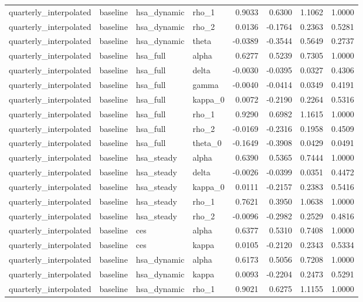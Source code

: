\begin{tabular}{llllrrrr}
quarterly\_interpolated & baseline & hsa\_dynamic & rho\_1 & 0.9033 & 0.6300 & 1.1062 & 1.0000 \\
quarterly\_interpolated & baseline & hsa\_dynamic & rho\_2 & 0.0136 & -0.1764 & 0.2363 & 0.5281 \\
quarterly\_interpolated & baseline & hsa\_dynamic & theta & -0.0389 & -0.3544 & 0.5649 & 0.2737 \\
quarterly\_interpolated & baseline & hsa\_full & alpha & 0.6277 & 0.5239 & 0.7305 & 1.0000 \\
quarterly\_interpolated & baseline & hsa\_full & delta & -0.0030 & -0.0395 & 0.0327 & 0.4306 \\
quarterly\_interpolated & baseline & hsa\_full & gamma & -0.0040 & -0.0414 & 0.0349 & 0.4191 \\
quarterly\_interpolated & baseline & hsa\_full & kappa\_0 & 0.0072 & -0.2190 & 0.2264 & 0.5316 \\
quarterly\_interpolated & baseline & hsa\_full & rho\_1 & 0.9290 & 0.6982 & 1.1615 & 1.0000 \\
quarterly\_interpolated & baseline & hsa\_full & rho\_2 & -0.0169 & -0.2316 & 0.1958 & 0.4509 \\
quarterly\_interpolated & baseline & hsa\_full & theta\_0 & -0.1649 & -0.3908 & 0.0429 & 0.0491 \\
quarterly\_interpolated & baseline & hsa\_steady & alpha & 0.6390 & 0.5365 & 0.7444 & 1.0000 \\
quarterly\_interpolated & baseline & hsa\_steady & delta & -0.0026 & -0.0399 & 0.0351 & 0.4472 \\
quarterly\_interpolated & baseline & hsa\_steady & kappa\_0 & 0.0111 & -0.2157 & 0.2383 & 0.5416 \\
quarterly\_interpolated & baseline & hsa\_steady & rho\_1 & 0.7621 & 0.3950 & 1.0638 & 1.0000 \\
quarterly\_interpolated & baseline & hsa\_steady & rho\_2 & -0.0096 & -0.2982 & 0.2529 & 0.4816 \\
quarterly\_interpolated & baseline & ces & alpha & 0.6377 & 0.5310 & 0.7408 & 1.0000 \\
quarterly\_interpolated & baseline & ces & kappa & 0.0105 & -0.2120 & 0.2343 & 0.5334 \\
quarterly\_interpolated & baseline & hsa\_dynamic & alpha & 0.6173 & 0.5056 & 0.7208 & 1.0000 \\
quarterly\_interpolated & baseline & hsa\_dynamic & kappa & 0.0093 & -0.2204 & 0.2473 & 0.5291 \\
quarterly\_interpolated & baseline & hsa\_dynamic & rho\_1 & 0.9021 & 0.6275 & 1.1155 & 1.0000 \\

\end{tabular}
